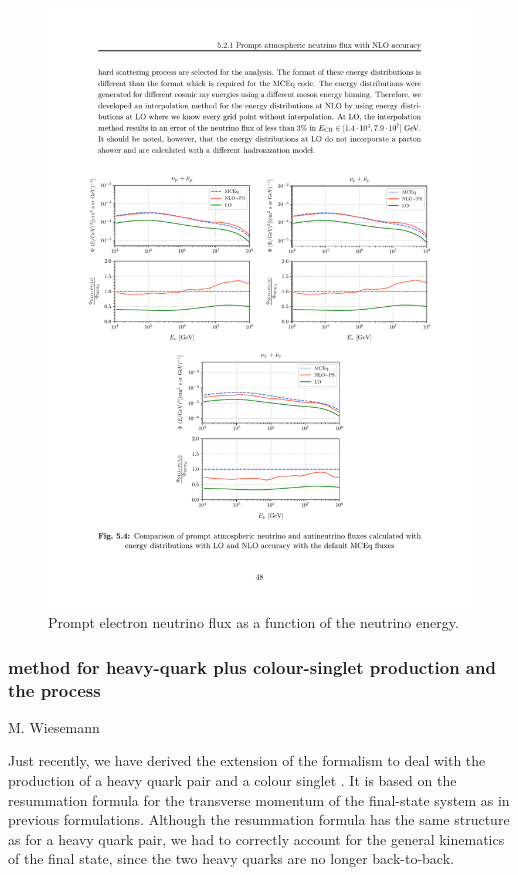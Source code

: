 \documentclass{FBR_Bericht_2025}
\begin{document}
\begin{refsection}
\begin{figure}[b!]
\begin{center}
\includegraphics[width=0.95\linewidth]{plots/cc_neutrino_flux.pdf}
\caption{Prompt electron neutrino flux as a function of the neutrino energy.}
\label{fig:neutrinoflux}
\end{center}
\end{figure}

%
\subsubsection[\minnlo{} method for heavy-quark plus colour-singlet production and application to $b\bar{b}Z$ process]{\minnlo{} method for heavy-quark plus colour-singlet production and the  process}
\begin{Namen}
M. Wiesemann
\end{Namen}
%
Just recently, we have derived the extension of the \minnlo{} formalism to deal with the production of a heavy quark pair and a colour singlet \cite{Mazzitelli:2024ura}.
It is based on the resummation formula for the transverse momentum of the final-state system as in previous \minnlo{} 
formulations. Although the resummation formula has the same structure as for a heavy quark pair, we had to correctly
account for the general kinematics of the final state, since the two heavy quarks are no longer back-to-back.


\end{refsection}
\end{document}
